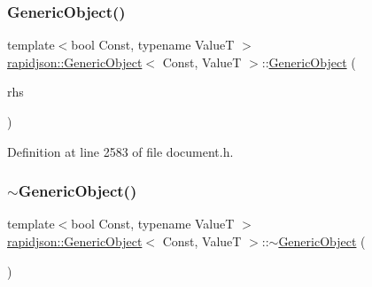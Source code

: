 \subsubsection{\texorpdfstring{GenericObject()}{GenericObject()}\hspace{0.1cm}{\footnotesize\ttfamily [1/3]}}
{\footnotesize\ttfamily template$<$bool Const, typename ValueT $>$ \\
\mbox{\hyperlink{classrapidjson_1_1_generic_object}{rapidjson\+::\+Generic\+Object}}$<$ Const, ValueT $>$\+::\mbox{\hyperlink{classrapidjson_1_1_generic_object}{Generic\+Object}} (\begin{DoxyParamCaption}\item[{\mbox{\hyperlink{classrapidjson_1_1_generic_object_a3524fcb5f36c034aabd8afa19fc16d9e}{const}} \mbox{\hyperlink{classrapidjson_1_1_generic_object}{Generic\+Object}}$<$ Const, ValueT $>$ \&}]{rhs }\end{DoxyParamCaption})}



Definition at line 2583 of file document.\+h.


\begin{DoxyCode}{0}

\end{DoxyCode}
\mbox{\label{classrapidjson_1_1_generic_object_acd045fbc7ffebf7902244fb1034b8751}} 
\subsubsection{\texorpdfstring{$\sim$GenericObject()}{~GenericObject()}}
{\footnotesize\ttfamily template$<$bool Const, typename ValueT $>$ \\
\mbox{\hyperlink{classrapidjson_1_1_generic_object}{rapidjson\+::\+Generic\+Object}}$<$ Const, ValueT $>$\+::$\sim$\mbox{\hyperlink{classrapidjson_1_1_generic_object}{Generic\+Object}} (\begin{DoxyParamCaption}{ }\end{DoxyParamCaption})}



